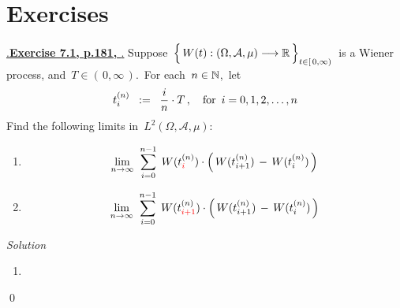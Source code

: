 

\section{Exercises}
\setcounter{theorem}{0}
\setcounter{equation}{0}


\renewcommand{\theenumi}{\roman{enumi}}
\renewcommand{\labelenumi}{\textnormal{(\theenumi)}$\;\;$}


\noindent
\underline{{\color{white}.}\textbf{Exercise 7.1, p.181, \cite{Brzezniak1999}}{\color{white}.}}
\vskip 0.3cm
\noindent
Suppose
\,$\left\{\,\overset{{\color{white}.}}{W}(t) : (\Omega,\mathcal{A},\mu) \longrightarrow \Re \,\right\}_{t\in[\,0,\infty)}$\,
is a Wiener process,
and \,$T \in (\,0,\infty\,)$.\,
For each \,$n \in \mathbb{N}$,\, let
\begin{equation*}
t^{(n)}_{i} \;\; := \;\; \dfrac{i}{n}\cdot T\,,
\quad
\textnormal{for \,$i = 0,1,2,\ldots,n$}
\end{equation*}
Find the following limits in \,$L^{2}(\Omega,\mathcal{A},\mu)$:
\begin{enumerate}
\item
	\begin{equation*}
	\underset{n\rightarrow\infty}{\lim}\;\;
	\overset{n-1}{\underset{i=0}{\sum}}\;\,
	W(t^{(n)}_{{\color{red}i}})\cdot\left(\,W(t^{(n)}_{i+1}) \,-\, W(t^{(n)}_{i})\,\right)
	\end{equation*}
\item
	\begin{equation*}
	\underset{n\rightarrow\infty}{\lim}\;\;
	\overset{n-1}{\underset{i=0}{\sum}}\;\,
	W(t^{(n)}_{{\color{red}i+1}})\cdot\left(\,W(t^{(n)}_{i+1}) \,-\, W(t^{(n)}_{i})\,\right)
	\end{equation*}
\end{enumerate}
\vskip 0.5cm
\noindent
\textit{Solution}\quad
\begin{enumerate}
\item
	
\end{enumerate}
\qed


\renewcommand{\theenumi}{\roman{enumi}}
\renewcommand{\labelenumi}{\textnormal{(\theenumi)}$\;\;$}

